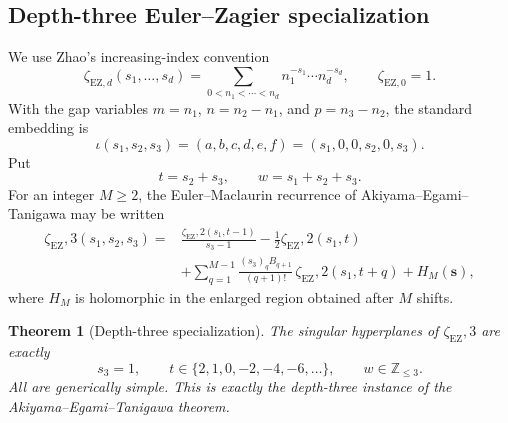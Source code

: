 \documentclass[11pt]{article}
\newtheorem{theorem}{Theorem}[section]
\renewcommand{\boxed}[1]{#1}
\newcommand{\EZ}{\zeta_{\mathrm{EZ}}}
\begin{document}
\subsection{Depth-three Euler--Zagier specialization}

We use Zhao's increasing-index convention
\[
 \zeta_{\mathrm{EZ},d}(s_1,\ldots,s_d)
 =\sum_{0<n_1<\cdots<n_d}
   n_1^{-s_1}\cdots n_d^{-s_d},
 \qquad \zeta_{\mathrm{EZ},0}=1.
\]
With the gap variables
\(m=n_1\), \(n=n_2-n_1\), and \(p=n_3-n_2\), the standard embedding is
\begin{equation}\label{eq:EZ3map}
 \iota(s_1,s_2,s_3)
 =(a,b,c,d,e,f)=(s_1,0,0,s_2,0,s_3).
\end{equation}
Put
\[
 t=s_2+s_3,\qquad w=s_1+s_2+s_3.
\]
For an integer \(M\ge2\), the Euler--Maclaurin recurrence of
Akiyama--Egami--Tanigawa may be written
\begin{equation}\label{eq:AET-rec}
\begin{aligned}
 \EZ,3(s_1,s_2,s_3)
={}&\frac{\EZ,2(s_1,t-1)}{s_3-1}
 -\frac12\EZ,2(s_1,t)\\
 &+\sum_{q=1}^{M-1}
 \frac{(s_3)_qB_{q+1}}{(q+1)!}\,
 \EZ,2(s_1,t+q)
 +H_M(\mathbf s),
\end{aligned}
\end{equation}
where \(H_M\) is holomorphic in the enlarged region obtained after
\(M\) shifts.

\begin{theorem}[Depth-three specialization]\label{thm:EZ3}
The singular hyperplanes of \(\EZ,3\) are exactly
\[
 \boxed{
 s_3=1,\qquad
 t\in\{2,1,0,-2,-4,-6,\ldots\},\qquad
 w\in\mathbb Z_{\le3}.}
\]
All are generically simple.  This is exactly the depth-three instance
of the Akiyama--Egami--Tanigawa theorem.
\end{theorem}
\end{document}
